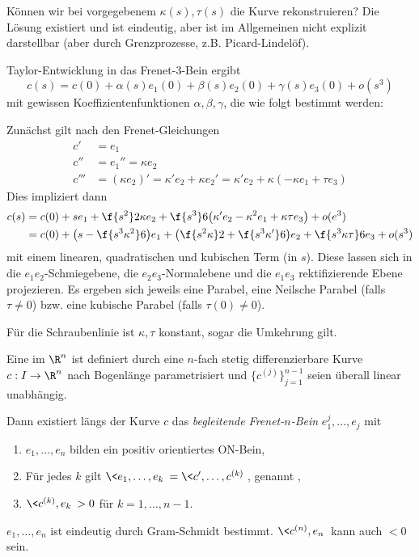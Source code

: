 Können wir bei vorgegebenem $\kappa(s), \tau(s)$ die Kurve rekonstruieren?
Die Lösung existiert und ist eindeutig, aber ist im Allgemeinen nicht explizit darstellbar (aber durch Grenzprozesse, z.B. Picard-Lindelöf).

Taylor-Entwicklung in das Frenet-3-Bein ergibt
\[
	c(s) = c(0) + \alpha(s)e_1(0) + \beta(s) e_2(0) + \gamma(s) e_3(0) + o(s^3)
\]
mit gewissen Koeffizientenfunktionen $\alpha, \beta, \gamma$, die wie folgt bestimmt werden:

Zunächst gilt nach den Frenet-Gleichungen
\begin{align*}
	c' &= e_1 \\
	c'' &= e_1'' = \kappa e_2 \\
	c''' &= (\kappa e_2)' = \kappa' e_2 + \kappa e_2' = \kappa' e_2 + \kappa(-\kappa e_1 + \tau e_3)
\end{align*}
Dies impliziert dann
\begin{align*}
	c(s) &= c(0) + se_1 + \f {s^2}2 \kappa e_2 + \f {s^3}6 \big( \kappa' e_2 - \kappa^2 e_1 + \kappa \tau e_3 \big) + o(e^3) \\
	&= c(0) + \big( s - \f {s^3 \kappa^2}6 \big) e_1 + \big( \f {s^2 \kappa}2 + \f {s^3\kappa'}6 \big) e_2 + \f{s^3 \kappa \tau}6 e_3 + o(s^3)
\end{align*}
mit einem linearen, quadratischen und kubischen Term (in $s$).
Diese lassen sich in die $e_1e_2$-Schmiegebene, die $e_2e_3$-Normalebene und die $e_1e_3$ rektifizierende Ebene projezieren.
Es ergeben sich jeweils eine Parabel, eine Neilsche Parabel (falls $\tau \neq 0$) bzw. eine kubische Parabel (falls $\tau(0) \neq 0$).


Für die Schraubenlinie ist $\kappa, \tau$ konstant, sogar die Umkehrung gilt.




\begin{df}
	Eine  im $\R^n$ ist definiert durch eine $n$-fach stetig differenzierbare Kurve $c:I \to \R^n$ nach Bogenlänge parametrisiert und $\{c^{(j)}\}_{j=1}^{n-1}$ seien überall linear unabhängig.

	Dann existiert längs der Kurve $c$ das \emph{begleitende Frenet-$n$-Bein} $e_1^{j}, \dotsc, e_{j}$ mit
	\begin{enumerate}[1)]
		\item
			$e_1, \dotsc, e_n$ bilden ein positiv orientiertes ON-Bein,
		\item
			Für jedes $k$ gilt $\<e_1, \dotsc, e_k\> = \<c', \dotsc, c^{(k)}\>$, genannt ,
		\item
			$\<c^{(k)}, e_k\> > 0$ für $k = 1, \dotsc, n-1$.
	\end{enumerate}
	\begin{note}
		$e_1, \dotsc, e_n$ ist eindeutig durch Gram-Schmidt bestimmt.
		$\<c^{(n)}, e_n\>$ kann auch $< 0$ sein.
	\end{note}
\end{df}


